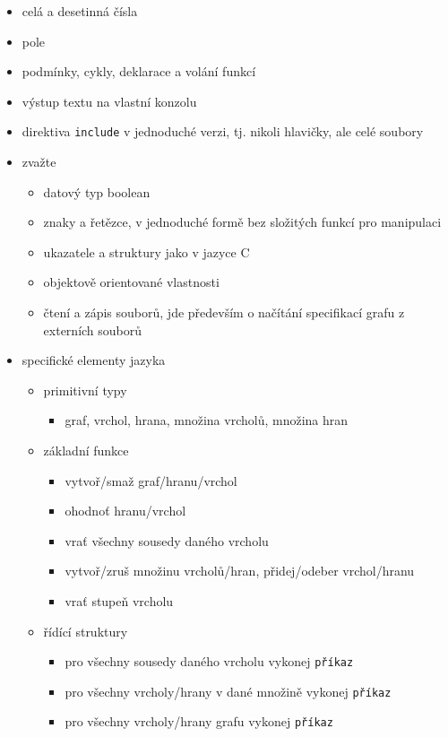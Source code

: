 \documentclass[11pt,twoside,a4paper]{book}
\begin{document}
\begin{itemize}
\item celá a desetinná čísla
\item pole
\item podmínky, cykly, deklarace a volání funkcí
\item výstup textu na vlastní konzolu
\item direktiva \texttt{include} v jednoduché verzi, tj. nikoli hlavičky, ale celé soubory

\item zvažte
	\begin{itemize}
	\item datový typ boolean
	\item znaky a řetězce, v jednoduché formě bez složitých funkcí pro manipulaci
	\item ukazatele a struktury jako v jazyce C
	\item objektově orientované vlastnosti
	\item čtení a zápis souborů, jde především o načítání specifikací grafu z externích souborů
	\end{itemize}

\item specifické elementy jazyka
	\begin{itemize}
	\item primitivní typy
		\begin{itemize}
		\item graf, vrchol, hrana, množina vrcholů, množina hran
		\end{itemize}
	\item základní funkce
		\begin{itemize}
		\item vytvoř/smaž graf/hranu/vrchol
		\item ohodnoť hranu/vrchol
		\item vrať všechny sousedy daného vrcholu
		\item vytvoř/zruš množinu vrcholů/hran, přidej/odeber vrchol/hranu
		\item vrať stupeň vrcholu
		\end{itemize}
	\item řídící struktury
		\begin{itemize}
		\item pro všechny sousedy daného vrcholu vykonej \texttt{příkaz}
		\item pro všechny vrcholy/hrany v dané množině vykonej \texttt{příkaz}
		\item pro všechny vrcholy/hrany grafu vykonej \texttt{příkaz}
		\end{itemize}
	\end{itemize}
\end{itemize}
\end{document}
